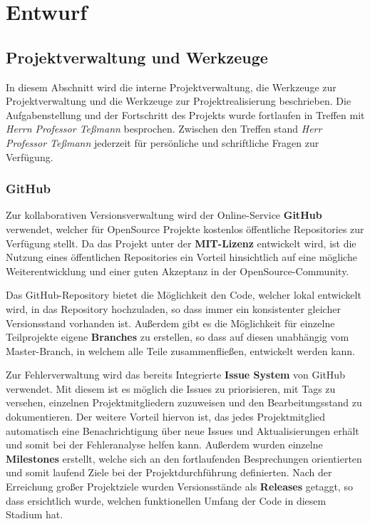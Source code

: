 \chapter{Entwurf}
\section{Projektverwaltung und Werkzeuge}
In diesem Abschnitt wird die interne Projektverwaltung, die Werkzeuge zur Projektverwaltung und die Werkzeuge zur Projektrealisierung beschrieben.
Die Aufgabenstellung und der Fortschritt des Projekts wurde fortlaufen in Treffen mit \textit{Herrn Professor Teßmann} besprochen. Zwischen den Treffen stand \textit{Herr Professor Teßmann} jederzeit für persönliche und schriftliche Fragen zur Verfügung.

\subsection{GitHub}
Zur kollaborativen Versionsverwaltung wird der Online-Service \textbf{GitHub} verwendet, welcher für OpenSource Projekte kostenlos öffentliche Repositories zur Verfügung stellt. Da das Projekt unter der \textbf{MIT-Lizenz} entwickelt wird, ist die Nutzung eines öffentlichen Repositories ein Vorteil hinsichtlich auf eine mögliche Weiterentwicklung und einer guten Akzeptanz in der OpenSource-Community.

Das GitHub-Repository bietet die Möglichkeit den Code, welcher lokal entwickelt wird, in das Repository hochzuladen, so dass immer ein konsistenter gleicher Versionsstand vorhanden ist. Außerdem gibt es die Möglichkeit für einzelne Teilprojekte eigene \textbf{Branches} zu erstellen, so dass auf diesen unabhängig vom Master-Branch, in welchem alle Teile zusammenfließen, entwickelt werden kann.

Zur Fehlerverwaltung wird das bereits Integrierte \textbf{Issue System} von GitHub verwendet. Mit diesem ist es möglich die Issues zu priorisieren, mit Tags zu versehen, einzelnen Projektmitgliedern zuzuweisen und den Bearbeitungsstand zu dokumentieren. Der weitere Vorteil hiervon ist, das jedes Projektmitglied automatisch eine Benachrichtigung über neue Issues und Aktualisierungen erhält und somit bei der Fehleranalyse helfen kann.
Außerdem wurden einzelne \textbf{Milestones} erstellt, welche sich an den fortlaufenden Besprechungen orientierten und somit laufend Ziele bei der Projektdurchführung definierten. Nach der Erreichung großer Projektziele wurden Versionsstände als \textbf{Releases} getaggt, so dass ersichtlich wurde, welchen funktionellen Umfang der Code in diesem Stadium hat.


